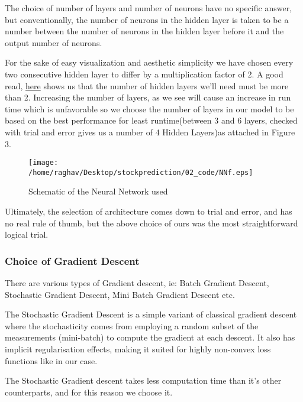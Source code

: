 \documentclass[12pt]{report}
\begin{document}
The choice of number of layers and number of neurons have no specific answer, but conventionally, the number of neurons in the hidden layer is taken to be a number between the number of neurons in the hidden layer before it and the output number of neurons.

For the sake of easy visualization and aesthetic simplicity we have chosen every two consecutive hidden layer to differ by a multiplication
factor of 2.
A good read, \href{https://www.heatonresearch.com/2017/06/01/hidden-layers.html}{here} shows us that the number of hidden layers we'll need must be more than 2.
Increasing the number of layers, as we see will cause an increase in run time which is unfavorable so we choose the number of layers in our model to be based on the best performance for least runtime(between 3 and 6 layers, checked with trial and error gives us a number of 4 Hidden Layers)as attached in Figure 3.
\begin{figure}
\texttt{[image: /home/raghav/Desktop/stockprediction/02\_code/NNf.eps]}
\caption{Schematic of the Neural Network used}
\end{figure} 
Ultimately, the selection of architecture comes down to trial and error, and has no real rule of thumb, but the above choice of ours was the most straightforward logical trial.
\subsubsection{Choice of Gradient Descent}
There are various types of Gradient descent, ie: Batch Gradient Descent, Stochastic Gradient Descent, Mini Batch Gradient Descent etc.

The Stochastic Gradient Descent is a simple variant of classical gradient descent where the stochasticity comes from employing a random subset of the measurements (mini-batch) to compute the gradient at each descent. It also has implicit regularisation effects, making it suited for highly non-convex loss functions like in our case.

The Stochastic Gradient descent takes less computation time than it's other counterparts, and for this reason we choose it.
\end{document}
